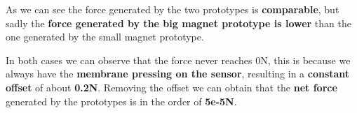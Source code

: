 As we can see the force generated by the two prototypes is \textbf{comparable}, but sadly the \textbf{force generated by the big magnet prototype is lower} than the one generated by the small magnet prototype.

In both cases we can observe that the force never reaches 0N, this is because we always have the \textbf{membrane pressing on the sensor}, resulting in a \textbf{constant offset} of about \textbf{0.2N}.
Removing the offset we can obtain that the \textbf{net force} generated by the prototypes is in the order of \textbf{5e-5N}.